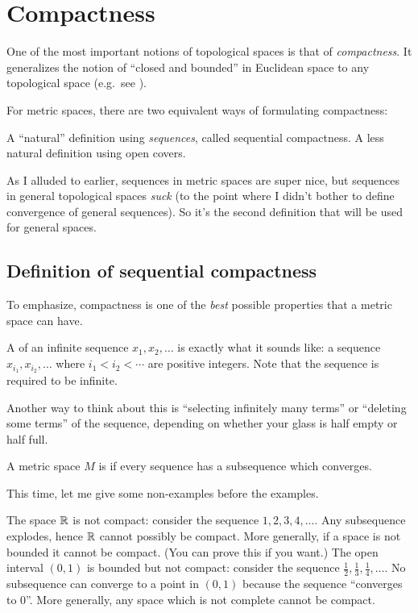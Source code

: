 \chapter{Compactness}
\label{ch:compactness}
One of the most important notions of topological spaces is that of \emph{compactness}.
It generalizes the notion of ``closed and bounded'' in Euclidean space
to any topological space
(e.g.\ see ).

For metric spaces, there are two equivalent ways of formulating compactness:
\begin{itemize}
	\ii A ``natural'' definition using \emph{sequences}, called sequential compactness.
	\ii A less natural definition using open covers.
\end{itemize}
As I alluded to earlier, sequences in metric spaces are super nice,
but sequences in general topological spaces \emph{suck} (to the point where
I didn't bother to define convergence of general sequences).
So it's the second definition that will be used for general spaces.

\section{Definition of sequential compactness}
To emphasize, compactness is one of the
\emph{best} possible properties that a metric space can have.
\begin{definition}
	A  of an infinite sequence
	$x_1, x_2, \dots$ is exactly what it sounds like:
	a sequence $x_{i_1}, x_{i_2}, \dots$
	where $i_1 < i_2 < \cdots$ are positive integers.
	Note that the sequence is required to be infinite.
\end{definition}
Another way to think about this is ``selecting infinitely many terms''
or ``deleting some terms'' of the sequence, depending on whether
your glass is half empty or half full.

\begin{definition}
	A metric space $M$ is  if
	every sequence has a subsequence which converges.
\end{definition}
This time, let me give some non-examples before the examples.
\begin{example}
	\listhack
	\begin{enumerate}[(a)]
		\ii The space $\mathbb R$ is not compact: consider the sequence $1,2,3,4,\dots$.
		Any subsequence explodes, hence $\mathbb R$ cannot possibly be compact.
		\ii More generally, if a space is
		not bounded it cannot be compact.
		(You can prove this if you want.)
		\ii The open interval $(0,1)$ is bounded but not compact:
		consider the sequence $\frac12, \frac13, \frac14, \dots$.
		No subsequence can converge to a point in $(0,1)$ because the sequence ``converges to $0$''.
		\ii More generally, any space which is not complete cannot be compact.
	\end{enumerate}
\end{example}


